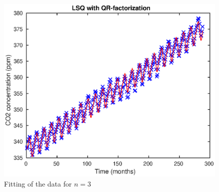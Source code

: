 \begin{figure}
\begin{center}
\includegraphics[scale=0.7]{lsp.eps}
\caption{Fitting of the data for $n=3$}
\label{lsp}
\end{center}
\end{figure}
\FloatBarrier